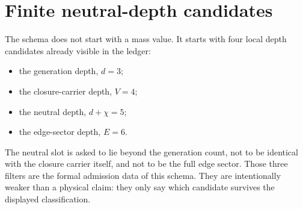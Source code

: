 \documentclass[11pt]{article}
\begin{document}
\section{Finite neutral-depth candidates}

The schema does not start with a mass value.  It starts with four local
depth candidates already visible in the ledger:

\begin{itemize}
\item the generation depth, $d = 3$;
\item the closure-carrier depth, $V = 4$;
\item the neutral depth, $d + \chi = 5$;
\item the edge-sector depth, $E = 6$.
\end{itemize}

The neutral slot is asked to lie beyond the generation count, not to be
identical with the closure carrier itself, and not to be the full edge
sector.  Those three filters are the formal admission data of this
schema.  They are intentionally weaker than a physical claim:
they only say which candidate survives the displayed classification.
\end{document}
